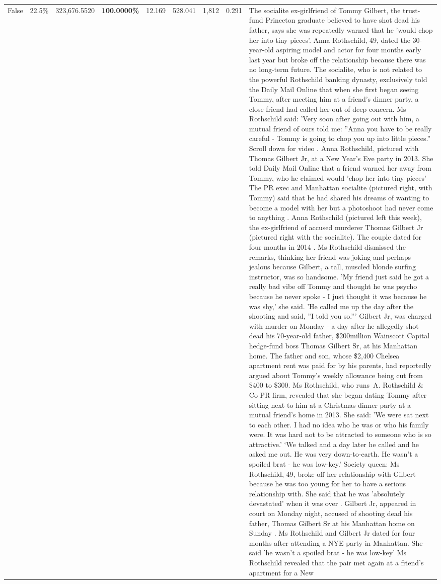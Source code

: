 \begin{table}[H]
\begin{tabular}{lllrlllll}
False & 22.5\% & 323,676.5520 & \bfseries \color{red} 100.0000\% & 12.169 & 528.041 & 1,812 & 0.291 & The socialite ex-girlfriend of Tommy Gilbert, the trust-fund Princeton graduate believed to have shot dead his father, says she was repeatedly warned that he 'would chop her into tiny pieces'. Anna Rothschild, 49, dated the 30-year-old aspiring model and actor for four months early last year but broke off the relationship because there was no long-term future. The socialite, who is not related to the powerful Rothschild banking dynasty, exclusively told the Daily Mail Online that when she first began seeing Tommy, after meeting him at a friend's dinner party, a close friend had called her out of deep concern. Ms Rothschild said: 'Very soon after going out with him, a mutual friend of ours told me: ''Anna you have to be really careful - Tommy is going to chop you up into little pieces.'' Scroll down for video . Anna Rothschild, pictured with Thomas Gilbert Jr, at a New Year's Eve party in 2013. She told Daily Mail Online that a friend warned her away from Tommy, who he claimed would 'chop her into tiny pieces' The PR exec and Manhattan socialite (pictured right, with Tommy) said that he had shared his dreams of wanting to become a model with her but a photoshoot had never come to anything . Anna Rothschild (pictured left this week), the ex-girlfriend of accused murderer Thomas Gilbert Jr (pictured right with the socialite). The couple dated for four months in 2014 . Ms Rothschild dismissed the remarks, thinking her friend was joking and perhaps jealous because Gilbert, a tall, muscled blonde surfing instructor, was so handsome. 'My friend just said he got a really bad vibe off Tommy and thought he was psycho because he never spoke - I just thought it was because he was shy,' she said. 'He called me up the day after the shooting and said, ''I told you so.''' Gilbert Jr, was charged with murder on Monday - a day after he allegedly shot dead his 70-year-old father, \$200million Wainscott Capital hedge-fund boss Thomas Gilbert Sr, at his Manhattan home. The father and son, whose \$2,400 Chelsea apartment rent was paid for by his parents, had reportedly argued about Tommy's weekly allowance being cut from \$400 to \$300. Ms Rothschild, who runs A. Rothschild \& Co PR firm, revealed that she began dating Tommy after sitting next to him at a Christmas dinner party at a mutual friend's home in 2013. She said: 'We were sat next to each other. I had no idea who he was or who his family were. It was hard not to be attracted to someone who is so attractive.' ‘We talked and a day later he called and he asked me out. He was very down-to-earth. He wasn’t a spoiled brat - he was low-key.’ Society queen: Ms Rothschild, 49, broke off her relationship with Gilbert because he was too young for her to have a serious relationship with. She said that he was 'absolutely devastated' when it was over . Gilbert Jr, appeared in court on Monday night, accused of shooting dead his father, Thomas Gilbert Sr at his Manhattan home on Sunday . Ms Rothschild and Gilbert Jr dated for four months after attending a NYE party in Manhattan. She said 'he wasn't a spoiled brat - he was low-key' Ms Rothschild revealed that the pair met again at a friend’s apartment for a New 
\end{tabular}
\end{table}
